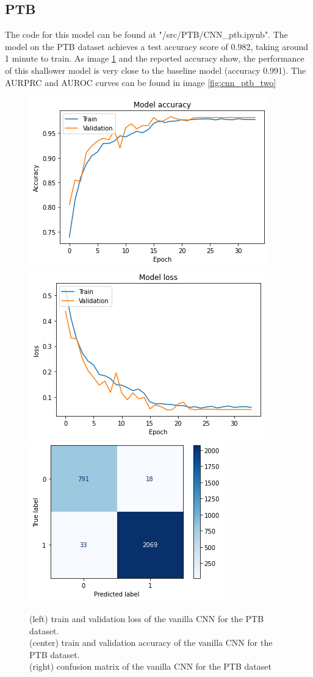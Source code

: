 \documentclass[11pt]{scrartcl}
\begin{document}
\subsection{PTB}
The code for this model can be found at "/src/PTB/CNN\_ptb.ipynb".
The model on the PTB dataset achieves a test accuracy score of 0.982, taking around 1 minute to train. 
As image \ref{fig:cnn_ptb_three} and the reported accuracy show, the performance of this shallower model is very close to the baseline model (accuracy 0.991).
The AURPRC and AUROC curves can be found in image \ref{fig:cnn_ptb_two}
\begin{figure}[htp]
\centering
\includegraphics[width=.30\textwidth]{../models_performance_graphs/ptb/cnn_ptb_accuracy.png}\hfill
\includegraphics[width=.30\textwidth]{../models_performance_graphs/ptb/cnn_ptb_loss.png}\hfill
\includegraphics[width=.30\textwidth]{../models_performance_graphs/ptb/cnn_ptb_confusion.png}\hfill
\caption{(left) train and validation loss of the vanilla CNN for the PTB dataset. \\ (center) train and validation accuracy of the vanilla CNN for the PTB dataset. \\(right) confusion matrix of the vanilla CNN for the PTB dataset}
\label{fig:cnn_ptb_three}
\end{figure}
\end{document}
